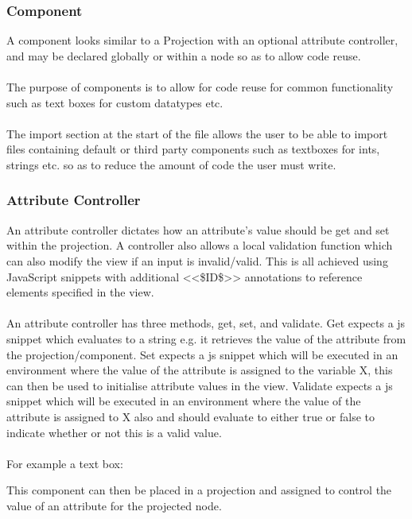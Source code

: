 \documentclass{article}
\begin{document}
{\subsubsection{Component}


A component looks similar to a Projection with an optional attribute controller, and may be declared globally or within a node so as to allow code reuse.
\\
\\
The purpose of components is to allow for code reuse for common functionality such as text boxes for custom datatypes etc.
\\
\\
The import section at the start of the file allows the user to be able to import files containing default or third party components such as textboxes for ints, strings etc. so as to reduce the amount of code the user must write. 

\subsubsection{Attribute Controller}

An attribute controller dictates how an attribute's value should be get and set within the projection. A controller also allows a local validation function which can also modify the view if an input is invalid/valid. This is all achieved using JavaScript snippets with additional <<\$ID\$>> annotations to reference elements specified in the view.
\\
\\
An attribute controller has three methods, get, set, and validate. Get expects a js snippet which evaluates to a string e.g. it retrieves the value of the attribute from the projection/component. Set expects a js snippet which will be executed in an environment where the value of the attribute is assigned to the variable X, this can then be used to initialise attribute values in the view. Validate expects a js snippet which will be executed in an environment where the value of the attribute is assigned to X also and should evaluate to either true or false to indicate whether or not this is a valid value. 
\\
\\
For example a text box: 

This component can then be placed in a projection and assigned to control the value of an attribute for the projected node.

}
\end{document}
